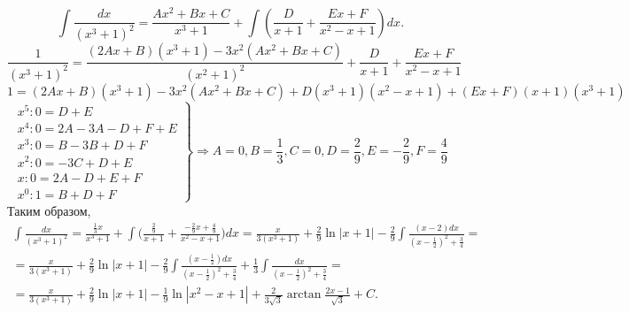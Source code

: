 \begin{example} $$\int\frac{dx}{(x^3+1)^2}=\frac{Ax^2+Bx+C}{x^3+1}+\int(\frac{D}{x+1}+\frac{Ex+F}{x^2-x+1})dx.$$
	$$\frac{1}{(x^3+1)^2}=\frac{(2Ax+B)(x^3+1)-3x^2(Ax^2+Bx+C)}{(x^2+1)^2}+\frac{D}{x+1}+\frac{Ex+F}{x^2-x+1}$$
	$$1=(2Ax+B)(x^3+1)-3x^2(Ax^2+Bx+C)+D(x^3+1)(x^2-x+1)+(Ex+F)(x+1)(x^3+1)$$
	$$\left.\begin{gathered}
		x^5: 0=D+E\\
		x^4: 0=2A-3A-D+F+E\\
		x^3: 0=B-3B+D+F\\
		x^2: 0=-3C+D+E\\
		x: 0=2A-D+E+F\\
		x^0: 1=B+D+F
	\end{gathered}\right\}\Rightarrow A=0,B=\frac{1}{3},C=0,D=\frac{2}{9}, E=-\frac{2}{9}, F=\frac{4}{9}$$
	Таким образом,
	\begin{multline*}
		\int\frac{dx}{(x^3+1)^2}=\frac{\frac{1}{3}x}{x^3+1}+\int\Big(\frac{\frac{2}{9}}{x+1}+\frac{-\frac{2}{9}x+\frac{4}{9}}{x^2-x+1}\Big)dx=\frac{x}{3(x^3+1)}+\frac{2}{9}\ln{|x+1|}-\frac{2}{9}\int\frac{(x-2)dx}{(x-\frac{1}{2})^2+\frac{3}{4}}=\\=\frac{x}{3(x^3+1)}+\frac{2}{9}\ln{|x+1|}-\frac{2}{9}\int\frac{(x-\frac{1}{2})dx}{(x-\frac{1}{2})^2+\frac{3}{4}}+\frac{1}{3}\int\frac{dx}{(x-\frac{1}{2})^2+\frac{3}{4}}=\\=\frac{x}{3(x^3+1)}+\frac{2}{9}\ln{|x+1|}-\frac{1}{9}\ln{|x^2-x+1|}+\frac{2}{3\sqrt{3}}\arctan{\frac{2x-1}{\sqrt{3}}}+C.
	\end{multline*}
\end{example}
